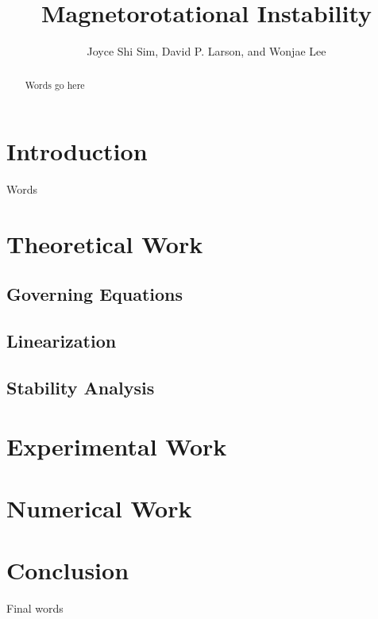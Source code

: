 \documentclass[10pt]{article}
\title{Magnetorotational Instability}
\author{Joyce Shi Sim, David P. Larson, and Wonjae Lee}
\begin{document}
\maketitle


\begin{abstract}
Words go here
\end{abstract}



\section{Introduction}
Words



\section{Theoretical Work}

\subsection{Governing Equations}

\subsection{Linearization}

\subsection{Stability Analysis}



\section{Experimental Work}



\section{Numerical Work}



\section{Conclusion}
Final words
\end{document}
